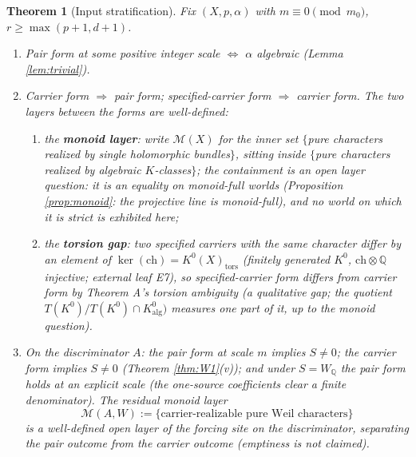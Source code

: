 \documentclass[11pt]{article}
\newtheorem{theorem}{Theorem}
\begin{document}
\begin{theorem}[Input stratification]\label{thm:W2}
Fix $(X,p,\alpha)$ with $m\equiv0\pmod{m_0}$, $r\ge\max(p+1,d+1)$.
\begin{enumerate}[label=(\roman*)]
\item Pair form at some positive integer scale $\Leftrightarrow$ $\alpha$ algebraic (Lemma \ref{lem:trivial}).
\item Carrier form $\Rightarrow$ pair form; specified-carrier form $\Rightarrow$ carrier form. The two layers between
the forms are well-defined:
\begin{enumerate}[label=(\roman*)]
\item the \textbf{monoid layer}: write $\mathcal{M}(X)$ for the inner set $\{$pure characters realized by single
holomorphic bundles$\}$, sitting inside $\{$pure characters realized by algebraic $K$-classes$\}$; the containment
is an \emph{open} layer question: it is an equality on monoid-full worlds (Proposition \ref{prop:monoid}: the
projective line is monoid-full), and no world on which it is strict is exhibited here;
\item the \textbf{torsion gap}: two specified carriers with the same character differ by an element of
$\ker(\mathrm{ch})=K^0(X)_{\mathrm{tors}}$ (finitely generated $K^0$, $\mathrm{ch}\otimes\mathbb{Q}$ injective;
external leaf E7), so specified-carrier form differs from carrier form by Theorem A's torsion ambiguity
(a qualitative gap; the quotient $T(K^0)/T(K^0)\cap K^0_{\mathrm{alg}})$ measures one part of it, up to the
monoid question).
\end{enumerate}
\item On the discriminator $A$: the pair form at scale $m$ implies $S\ne0$; the carrier form implies $S\ne0$
(Theorem \ref{thm:W1}(v)); and under $S=W_\mathbb{Q}$ the pair form holds at an explicit scale (the one-source
coefficients clear a finite denominator). The residual monoid layer
\[
\mathcal{M}(A,W):=\{\text{carrier-realizable pure Weil characters}\}
\]
is a well-defined open layer of the forcing site on the discriminator, separating the pair outcome from the
carrier outcome (emptiness is not claimed).
\end{enumerate}
\end{theorem}
\end{document}
